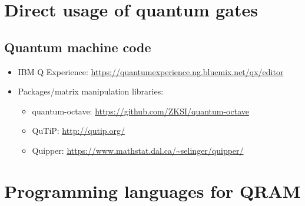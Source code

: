 \documentclass{beamer}
\begin{document}
\section{Direct usage of quantum gates}

\subsection{Quantum machine code}

\begin{frame}{\insertsection}{\insertsubsection}
    \begin{itemize}
    \item IBM Q Experience: 
    {\small\url{https://quantumexperience.ng.bluemix.net/qx/editor}}
    \item Packages/matrix manipulation libraries:
    \begin{itemize}
        \item quantum-octave: 
        {\small \url{https://github.com/ZKSI/quantum-octave}}
        \item QuTiP: {\small\url{http://qutip.org/}}
        \item Quipper: 
        {\small\url{https://www.mathstat.dal.ca/~selinger/quipper/}}
    \end{itemize}
    \end{itemize}

\end{frame}


\section{Programming languages for QRAM}


\end{document}
